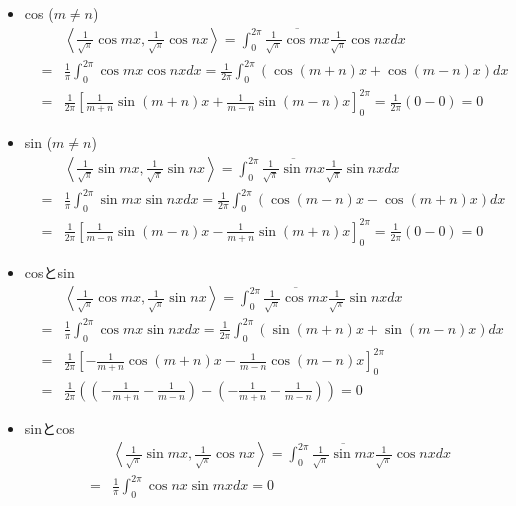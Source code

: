 \documentclass[a4paper,11pt]{jsarticle}
\begin{document}
\begin{itemize}
  \item cos ($m \neq n$)
    \begin{eqnarray*}
      && \left<\frac{1}{\sqrt{\pi}}\cos{mx}, \frac{1}{\sqrt{\pi}}\cos{nx}\right>
      = \int_{0}^{2\pi}{\overline{\frac{1}{\sqrt{\pi}}\cos{mx}}\frac{1}{\sqrt{\pi}}\cos{nx}}dx \\
      &=& \frac{1}{\pi}\int_{0}^{2\pi}{\cos{mx}\cos{nx}}dx
      = \frac{1}{2\pi}\int_{0}^{2\pi}{\left(\cos{(m + n)x} + \cos{(m - n)x}\right)}dx \\
      &=& \frac{1}{2\pi}\left[\frac{1}{m + n}\sin{(m + n)x} + \frac{1}{m - n}\sin{(m - n)x}\right]_{0}^{2\pi}
      = \frac{1}{2\pi}\left(0 - 0\right) = 0
    \end{eqnarray*}
  \item sin ($m \neq n$)
    \begin{eqnarray*}
      && \left<\frac{1}{\sqrt{\pi}}\sin{mx}, \frac{1}{\sqrt{\pi}}\sin{nx}\right>
      = \int_{0}^{2\pi}{\overline{\frac{1}{\sqrt{\pi}}\sin{mx}}\frac{1}{\sqrt{\pi}}\sin{nx}}dx \\
      &=& \frac{1}{\pi}\int_{0}^{2\pi}{\sin{mx}\sin{nx}}dx
      = \frac{1}{2\pi}\int_{0}^{2\pi}{\left(\cos{(m - n)x} - \cos{(m + n)x}\right)}dx \\
      &=& \frac{1}{2\pi}\left[\frac{1}{m - n}\sin{(m - n)x} - \frac{1}{m + n}\sin{(m + n)x}\right]_{0}^{2\pi}
      = \frac{1}{2\pi}\left(0 - 0\right) = 0
    \end{eqnarray*}
  \item cosとsin
    \begin{eqnarray*}
      && \left<\frac{1}{\sqrt{\pi}}\cos{mx}, \frac{1}{\sqrt{\pi}}\sin{nx}\right>
      = \int_{0}^{2\pi}{\overline{\frac{1}{\sqrt{\pi}}\cos{mx}}\frac{1}{\sqrt{\pi}}\sin{nx}}dx \\
      &=& \frac{1}{\pi}\int_{0}^{2\pi}{\cos{mx}\sin{nx}}dx
      = \frac{1}{2\pi}\int_{0}^{2\pi}{\left(\sin{(m + n)x} + \sin{(m - n)x}\right)}dx \\
      &=& \frac{1}{2\pi}\left[-\frac{1}{m + n}\cos{(m + n)x} - \frac{1}{m - n}\cos{(m - n)x}\right]_{0}^{2\pi} \\
      &=& \frac{1}{2\pi}\left(\left(-\frac{1}{m + n} -\frac{1}{m - n}\right)-\left(-\frac{1}{m + n} -\frac{1}{m - n}\right)\right) = 0
    \end{eqnarray*}
  \item sinとcos
    \begin{eqnarray*}
      && \left<\frac{1}{\sqrt{\pi}}\sin{mx}, \frac{1}{\sqrt{\pi}}\cos{nx}\right>
      = \int_{0}^{2\pi}{\overline{\frac{1}{\sqrt{\pi}}\sin{mx}}\frac{1}{\sqrt{\pi}}\cos{nx}}dx \\
      &=& \frac{1}{\pi}\int_{0}^{2\pi}{\cos{nx}\sin{mx}}dx
      = 0
    \end{eqnarray*}
\end{itemize}
\end{document}
